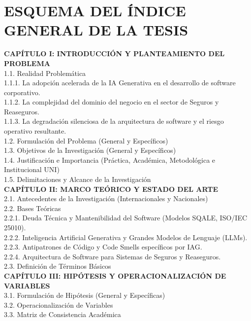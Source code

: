 \chapter*{ESQUEMA DEL ÍNDICE GENERAL DE LA TESIS}

{\small
\noindent\textbf{CAPÍTULO I: INTRODUCCIÓN Y PLANTEAMIENTO DEL PROBLEMA}\\
1.1. Realidad Problemática\\
1.1.1. La adopción acelerada de la IA Generativa en el desarrollo de software corporativo.\\
1.1.2. La complejidad del dominio del negocio en el sector de Seguros y Reaseguros.\\
1.1.3. La degradación silenciosa de la arquitectura de software y el riesgo operativo resultante.\\
1.2. Formulación del Problema (General y Específicos)\\
1.3. Objetivos de la Investigación (General y Específicos)\\
1.4. Justificación e Importancia (Práctica, Académica, Metodológica e Institucional UNI)\\
1.5. Delimitaciones y Alcance de la Investigación\\[6pt]

\noindent\textbf{CAPÍTULO II: MARCO TEÓRICO Y ESTADO DEL ARTE}\\
2.1. Antecedentes de la Investigación (Internacionales y Nacionales)\\
2.2. Bases Teóricas\\
2.2.1. Deuda Técnica y Mantenibilidad del Software (Modelos SQALE, ISO/IEC 25010).\\
2.2.2. Inteligencia Artificial Generativa y Grandes Modelos de Lenguaje (LLMs).\\
2.2.3. Antipatrones de Código y Code Smells específicos por IAG.\\
2.2.4. Arquitectura de Software para Sistemas de Seguros y Reaseguros.\\
2.3. Definición de Términos Básicos\\[6pt]

\noindent\textbf{CAPÍTULO III: HIPÓTESIS Y OPERACIONALIZACIÓN DE VARIABLES}\\
3.1. Formulación de Hipótesis (General y Específicas)\\
3.2. Operacionalización de Variables\\
3.3. Matriz de Consistencia Académica\\[6pt]

}
